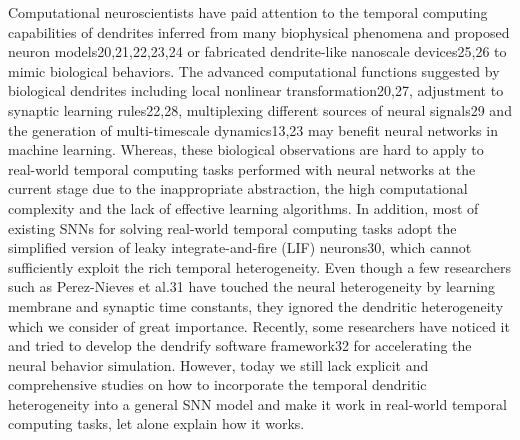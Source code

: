 Computational neuroscientists have paid attention to the temporal computing capabilities of dendrites inferred from many biophysical phenomena and proposed neuron models20,21,22,23,24 or fabricated dendrite-like nanoscale devices25,26 to mimic biological behaviors. The advanced computational functions suggested by biological dendrites including local nonlinear transformation20,27, adjustment to synaptic learning rules22,28, multiplexing different sources of neural signals29 and the generation of multi-timescale dynamics13,23 may benefit neural networks in machine learning. Whereas, these biological observations are hard to apply to real-world temporal computing tasks performed with neural networks at the current stage due to the inappropriate abstraction, the high computational complexity and the lack of effective learning algorithms. In addition, most of existing SNNs for solving real-world temporal computing tasks adopt the simplified version of leaky integrate-and-fire (LIF) neurons30, which cannot sufficiently exploit the rich temporal heterogeneity. Even though a few researchers such as Perez-Nieves et al.31 have touched the neural heterogeneity by learning membrane and synaptic time constants, they ignored the dendritic heterogeneity which we consider of great importance. Recently, some researchers have noticed it and tried to develop the dendrify software framework32 for accelerating the neural behavior simulation. However, today we still lack explicit and comprehensive studies on how to incorporate the temporal dendritic heterogeneity into a general SNN model and make it work in real-world temporal computing tasks, let alone explain how it works.

